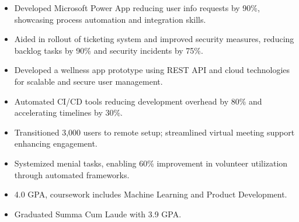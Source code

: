 \begin{itemize}
  \item Developed Microsoft Power App reducing user info requests by 90\%, showcasing process automation and integration skills.
  \item Aided in rollout of ticketing system and improved security measures, reducing backlog tasks by 90\% and security incidents by 75\%.
\end{itemize}

\divider

\begin{itemize}
  \item Developed a wellness app prototype using REST API and cloud technologies for scalable and secure user management.
  \item Automated CI/CD tools reducing development overhead by 80\% and accelerating timelines by 30\%.
\end{itemize}

\divider

\begin{itemize}
  \item Transitioned 3,000 users to remote setup; streamlined virtual meeting support enhancing engagement.
  \item Systemized menial tasks, enabling 60\% improvement in volunteer utilization through automated frameworks.
\end{itemize}

\par\bigskip
{}
\begin{itemize}
  \item 4.0 GPA, coursework includes Machine Learning and Product Development.
\end{itemize}
\divider
{}
\begin{itemize}
  \item Graduated Summa Cum Laude with 3.9 GPA.
\end{itemize}


